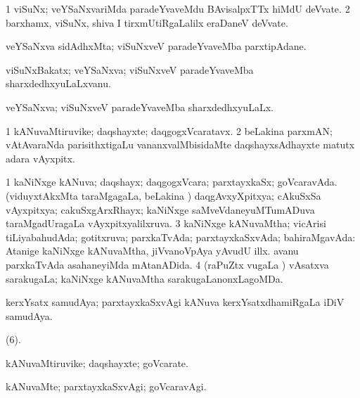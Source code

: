 {{{{{{{{{{\bentry
{} 
\gl{\nA}
\expl{}
\bmng
\bnum
\num{1} viSuNx; veYSaNxvariMda paradeYvaveMdu BAvisalpxTTx hiMdU deVvate. 
\num{2} barxhamx, viSuNx, shiva I tirxmUtiRgaLalilx eraDaneV deVvate. 
\enum
\emng
\eentry

\bentry
{} 
\gl{\nA}
\expl{}
\bmng
 veYSaNxva sidAdhxMta; viSuNxveV paradeYvaveMba parxtipAdane. 
\emng
\eentry

\bentry
{} 
\gl{\nA}
\expl{}
\bmng
 viSuNxBakatx; veYSaNxva; viSuNxveV paradeYvaveMba sharxdedhxyuLaLxvanu. 
\emng
\eentry

\bentry 
{} 
\gl{\gu}
\expl{}
\bmng
 veYSaNxva; viSuNxveV paradeYvaveMba sharxdedhxyuLaLx. 
\emng
\eentry

\bentry
{} 
\gl{\nA}
\expl{}
\bmng
\bnum
\num{1} kANuvaMtiruvike; daqshayxte; daqgogxVcaratavx. 
\num{2} beLakina parxmAN; vAtAvaraNda parisithxtigaLu \mo vananxvalMbisidaMte daqshayxsAdhayxte matutx adara vAyxpitx. 
\enum
\emng
\eentry

\bentry
{} 
\gl{\gu}
\expl{}
\bmng
\bnum
\num{1} kaNiNxge kANuva; daqshayx; daqgogxVcara; parxtayxkaSx; goVcaravAda. (viduyxtAkxMta taraMgagaLa, beLakina \vi) daqgAvxyXpitxya; cAkuSxSa vAyxpitxya; cakuSxgArxRhayx; kaNiNxge saMveVdaneyuMTumADuva taraMgadUragaLa vAyxpitxyalilxruva. 
\num{3} kaNiNxge kANuvaMtha; vicArisi tiLiyabahudAda; gotitxruva; parxkaTvAda; parxtayxkaSxvAda; bahiraMgavAda:  Atanige kaNiNxge kANuvaMtha, jiVvanoVpAya yAvudU illx.  avanu parxkaTvAda asahaneyiMda mAtanADida. 
\num{4} (raPuZtx \mo vugaLa \vi) vAsatxva sarakugaLa; kaNiNxge kANuvaMtha sarakugaLanonxLagoMDa. 
\enum
\emng

\noindent 
\gl{\pagu}
\expl{}
\bmng
  kerxYsatx samudAya; parxtayxkaSxvAgi kANuva kerxYsatxdhamiRgaLa iDiV samudAya. 
\emng
\eentry

\bentry
{}
\gl{\nA}
\expl{}
\bmng
  (\pagu $6$). 
\emng
\eentry

\bentry
{} 
\gl{\nA}
\expl{}
\bmng
 kANuvaMtiruvike; daqshayxte; goVcarate. 
\emng
\eentry

\bentry 
{} 
\gl{\kirxvi}
\expl{}
\bmng
 kANuvaMte; parxtayxkaSxvAgi; goVcaravAgi. 
\emng
\eentry

}}}}}}}}}}
